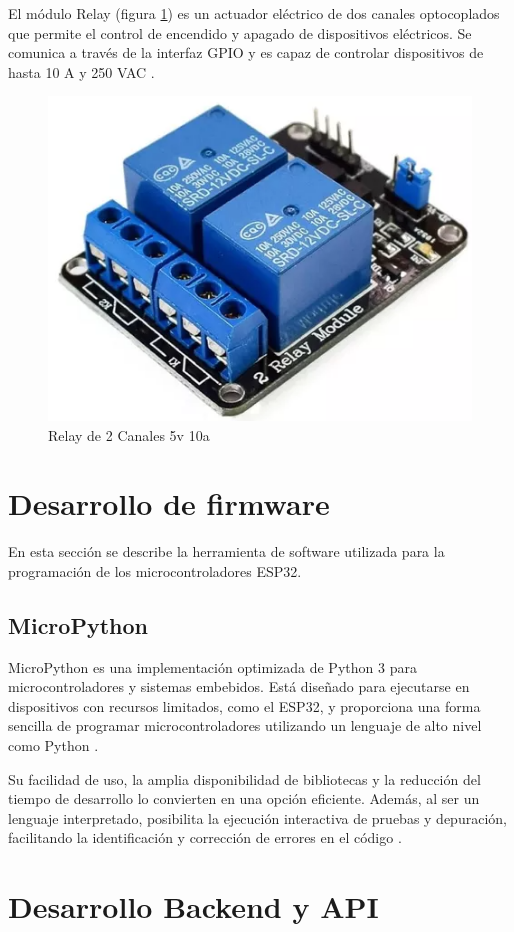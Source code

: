El módulo Relay (figura \ref{fig:Relay}) es un actuador eléctrico de dos
canales optocoplados que permite el control de encendido y apagado de
dispositivos eléctricos. Se comunica a través de la interfaz GPIO y es capaz de
controlar dispositivos de hasta 10 A y 250 VAC \cite{Relay}.

\begin{figure}[H]
	\centering
	\includegraphics[width=.15\textwidth]{./Images/13.png}
	\caption{Relay de 2 Canales 5v 10a}
	\label{fig:Relay}
\end{figure}


\section{Desarrollo de firmware}

En esta sección se describe la herramienta de software utilizada para la
programación de los microcontroladores ESP32.

\subsection{MicroPython}

MicroPython es una implementación optimizada de Python 3 para
microcontroladores y sistemas embebidos. Está diseñado para ejecutarse en
dispositivos con recursos limitados, como el ESP32, y proporciona una forma
sencilla de programar microcontroladores utilizando un lenguaje de alto nivel
como Python \cite{MicroPython}.

Su facilidad de uso, la amplia disponibilidad de bibliotecas y la reducción del
tiempo de desarrollo lo convierten en una opción eficiente. Además, al ser un
lenguaje interpretado, posibilita la ejecución interactiva de pruebas y
depuración, facilitando la identificación y corrección de errores en el código
\cite{CTAMicroPython}.

\section{Desarrollo Backend y API}


